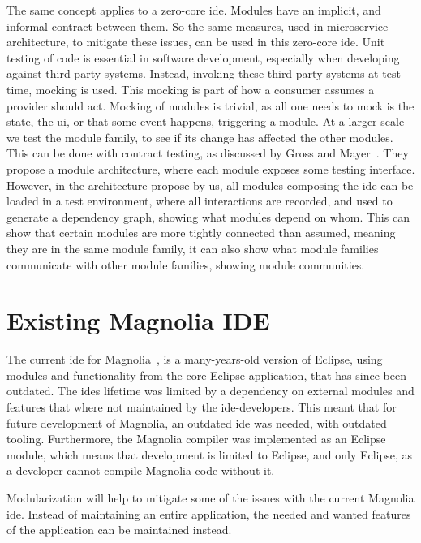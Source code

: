 The same concept applies to a zero-core \gls*{ide}. Modules have an implicit, and
informal contract between them. So the same measures, used in microservice
architecture, to mitigate these issues, can be used in this zero-core \gls*{ide}.
Unit testing of code is essential in software development, especially when
developing against third party systems. Instead, invoking these third party
systems at test time, mocking is used. This mocking is part of how a consumer
assumes a provider should act. Mocking of modules is trivial, as all one needs
to mock is the state, the \gls*{ui}, or that some event happens, triggering a
module. At a larger scale we test the module family, to see if its change has
affected the other modules. This can be done with contract testing, as discussed
by Gross and Mayer~\cite{GROSS200322}. They propose a module architecture, where
each module exposes some testing interface. However, in the architecture propose
by us, all modules composing the \gls*{ide} can be loaded in a test environment,
where all interactions are recorded, and used to generate a dependency graph,
showing what modules depend on whom. This can show that certain modules are more
tightly connected than assumed, meaning they are in the same module family, it
can also show what module families communicate with other module families,
showing module communities.

\section{Existing Magnolia IDE}

The current \gls*{ide} for Magnolia~\cite{baggeIde}, is a many-years-old version
of Eclipse, using modules and functionality from the core Eclipse application,
that has since been outdated. The \gls*{ide}s lifetime was limited by a
dependency on external modules and features that where not maintained by the
\gls*{ide}-developers. This meant that for future development of Magnolia, an
outdated \gls*{ide} was needed, with outdated tooling. Furthermore, the Magnolia
compiler was implemented as an Eclipse module, which means that development is
limited to Eclipse, and only Eclipse, as a developer cannot compile Magnolia
code without it.

Modularization will help to mitigate some of the issues with the current
Magnolia \gls*{ide}. Instead of maintaining an entire application, the needed and
wanted features of the application can be maintained instead.


